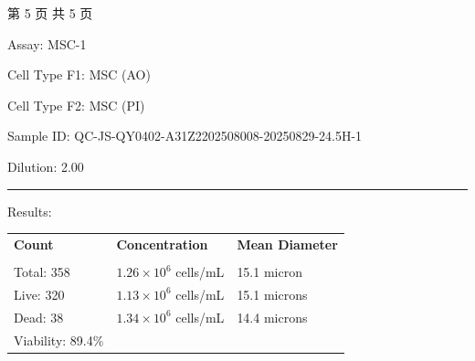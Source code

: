 \documentclass[UTF8,10pt,a4paper,fontset=fandol]{ctexart}
\renewcommand{\arraystretch}{1.15}
\newcommand{\fieldvalue}[1]{#1}
\begin{document}
\vfill

\begin{center}
\small 第 5 页 共 5 页
\end{center}

\newpage

Assay: \fieldvalue{MSC-1}

Cell Type F1: \fieldvalue{MSC (AO)}

Cell Type F2: \fieldvalue{MSC (PI)}

Sample ID: \fieldvalue{QC-JS-QY0402-A31Z2202508008-20250829-24.5H-1}

Dilution: \fieldvalue{2.00}

\vspace{0.5em}
\hrule
\vspace{0.3em}

Results:

\vspace{0.5em}
\renewcommand{\arraystretch}{1.15}
\begin{tabularx}{\textwidth}{@{}X X X@{}}
\textbf{Count} & \textbf{Concentration} & \textbf{Mean Diameter} \\
\underline{\rule{0pt}{1.2ex}\texttt{=============}} &
\underline{\rule{0pt}{1.2ex}\texttt{=============}} &
\underline{\rule{0pt}{1.2ex}\texttt{=============}} \\

Total:
\fieldvalue{358}
&
\fieldvalue{$1.26\times10^{6}$ cells/mL}
&
\fieldvalue{15.1 micron}
\\

Live:
\fieldvalue{320}
&
\fieldvalue{$1.13\times10^{6}$ cells/mL}
&
\fieldvalue{15.1 microns}
\\

Dead:
\fieldvalue{38}
&
\fieldvalue{$1.34\times10^{6}$ cells/mL}
&
\fieldvalue{14.4 microns}
\\

Viability:
\fieldvalue{89.4\%}
&
&
\end{tabularx}
\end{document}
